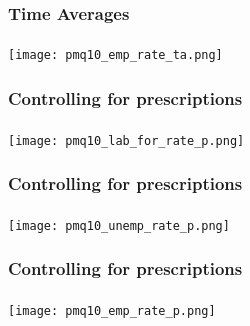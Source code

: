 \begin{frame}

    \label{ta_2}
    
    \frametitle{Time Averages} %
    \framesubtitle{}  %
    \rmfamily %

    \begin{center}
        \texttt{[image: pmq10\_emp\_rate\_ta.png]}
    \end{center}
    
    \hyperlink{emp_rate_result}{}
    
\end{frame}

\begin{frame}

    \label{presc_3}
    
    \frametitle{Controlling for prescriptions} %
    \framesubtitle{}  %
    \rmfamily %

    \begin{center}
        \texttt{[image: pmq10\_lab\_for\_rate\_p.png]}
    \end{center}
    
    \hyperlink{lab_force_rate_result}{}
    \hyperlink{presc_indeff}{}

\end{frame}

\begin{frame}

    \label{presc_1}
    
    \frametitle{Controlling for prescriptions} %
    \framesubtitle{}  %
    \rmfamily %

    \begin{center}
        \texttt{[image: pmq10\_unemp\_rate\_p.png]}
    \end{center}
    
    \hyperlink{unemp_rate_result}{}
    \hyperlink{presc_indeff}{}
    
\end{frame}

\begin{frame}

    \label{presc_2}
    
    \frametitle{Controlling for prescriptions} %
    \framesubtitle{}  %
    \rmfamily %

    \begin{center}
        \texttt{[image: pmq10\_emp\_rate\_p.png]}
    \end{center}
    
    \hyperlink{emp_rate_result}{}
    \hyperlink{presc_indeff}{}
    
\end{frame}

